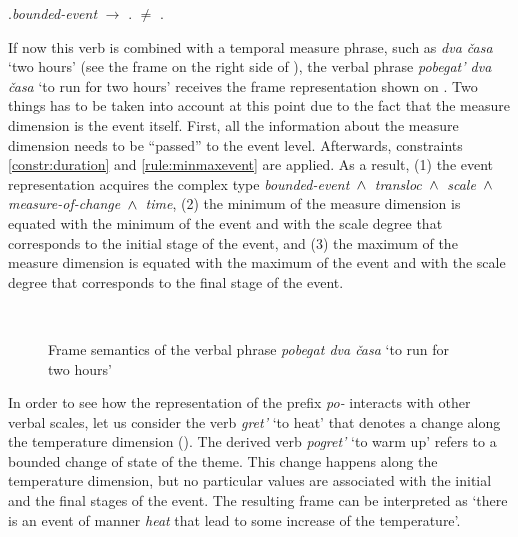 \ex.\label{const:diff}\textit{bounded-event} $\rightarrow$ \INIT.{\POS} $\neq$ \FIN.\POS

If now this verb is combined with a temporal measure phrase, such as \textit{dva \v{c}asa} `two hours' (see the frame on the right side of ), the verbal phrase \textit{pobegat' dva \v{c}asa} `to run for two hours' receives the frame representation shown on . Two things has to be taken into account at this point due to the fact that the measure dimension is the event itself. First, all the information about the measure dimension needs to be ``passed'' to the event level. Afterwards, constraints \ref{constr:duration} and \ref{rule:minmaxevent} are applied. As a result, (1) the event representation acquires the complex type \textit{bounded-event $\,\wedge\,$ transloc $\,\wedge\,$ scale $\,\wedge\,$ measure-of-change $\,\wedge\,$ time}, (2) the minimum of the measure dimension is equated with the minimum of the event and with the scale degree that corresponds to the initial stage of the event, and (3) the maximum of the measure dimension is equated with the maximum of the event and with the scale degree that corresponds to the final stage of the event.

\begin{figure}
\centering
{}\\
\caption{Frame semantics of the verbal phrase \textit{pobegat dva \v{c}asa} `to run for two hours' \label{frame:pobegat:2hours}}
\end{figure}


In order to see how the representation of the prefix \textit{po-} interacts with other verbal scales, let us consider the verb \textit{gret'} `to heat' that denotes a change along the temperature dimension (). The derived verb \textit{pogret'} `to warm up' refers to a bounded change of state of the theme. This change happens along the temperature dimension, but no particular values are associated with the initial and the final stages of the event. The resulting frame can be interpreted as `there is an event of manner \textit{heat} that lead to some increase of the temperature'.

